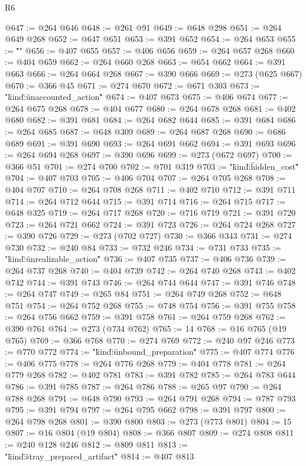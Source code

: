 \begin{lexlean}{R6}
\begin{coremodule}
{{{{{{{{{{@647 := @264 @646
@648 := @261 @91
@649 := @648 @298
@651 := @264 @649 @268
@652 := @647 @651
@653 := @391 @652
@654 := @264 @653
@655 := "\"}"
@656 := @407 @655
@657 := @406 @656
@659 := @264 @657 @268
@660 := @404 @659
@662 := @264 @660 @268
@663 := @654 @662
@664 := @391 @663
@666 := @264 @664 @268
@667 := @390 @666
@669 := @273 (@625 @667)
@670 := @366 @45
@671 := @274 @670
@672 := @671 @303
@673 := "{\"kind\":\"unaccounted_action\""
@674 := @407 @673
@675 := @406 @674
@677 := @264 @675 @268
@678 := @404 @677
@680 := @264 @678 @268
@681 := @402 @680
@682 := @391 @681
@684 := @264 @682 @644
@685 := @391 @684
@686 := @264 @685
@687 := @648 @309
@689 := @264 @687 @268
@690 := @686 @689
@691 := @391 @690
@693 := @264 @691 @662
@694 := @391 @693
@696 := @264 @694 @268
@697 := @390 @696
@699 := @273 (@672 @697)
@700 := @366 @51
@701 := @274 @700
@702 := @701 @319
@703 := "{\"kind\":\"hidden_cost\""
@704 := @407 @703
@705 := @406 @704
@707 := @264 @705 @268
@708 := @404 @707
@710 := @264 @708 @268
@711 := @402 @710
@712 := @391 @711
@714 := @264 @712 @644
@715 := @391 @714
@716 := @264 @715
@717 := @648 @325
@719 := @264 @717 @268
@720 := @716 @719
@721 := @391 @720
@723 := @264 @721 @662
@724 := @391 @723
@726 := @264 @724 @268
@727 := @390 @726
@729 := @273 (@702 @727)
@730 := @366 @343
@731 := @274 @730
@732 := @240 @84
@733 := @732 @246
@734 := @731 @733
@735 := "{\"kind\":\"unrealizable_action\""
@736 := @407 @735
@737 := @406 @736
@739 := @264 @737 @268
@740 := @404 @739
@742 := @264 @740 @268
@743 := @402 @742
@744 := @391 @743
@746 := @264 @744 @644
@747 := @391 @746
@748 := @264 @747
@749 := @265 @84
@751 := @264 @749 @268
@752 := @648 @751
@754 := @264 @752 @268
@755 := @748 @754
@756 := @391 @755
@758 := @264 @756 @662
@759 := @391 @758
@761 := @264 @759 @268
@762 := @390 @761
@764 := @273 (@734 @762)
@765 := 14
@768 := @16 @765 (@19 @765)
@769 := @366 @768
@770 := @274 @769
@772 := @240 @97 @246
@773 := @770 @772
@774 := "{\"kind\":\"unbound_preparation\""
@775 := @407 @774
@776 := @406 @775
@778 := @264 @776 @268
@779 := @404 @778
@781 := @264 @779 @268
@782 := @402 @781
@783 := @391 @782
@785 := @264 @783 @644
@786 := @391 @785
@787 := @264 @786
@788 := @265 @97
@790 := @264 @788 @268
@791 := @648 @790
@793 := @264 @791 @268
@794 := @787 @793
@795 := @391 @794
@797 := @264 @795 @662
@798 := @391 @797
@800 := @264 @798 @268
@801 := @390 @800
@803 := @273 (@773 @801)
@804 := 15
@807 := @16 @804 (@19 @804)
@808 := @366 @807
@809 := @274 @808
@811 := @240 @128 @246
@812 := @809 @811
@813 := "{\"kind\":\"stray_prepared_artifact\""
@814 := @407 @813
}}}}}}}}}}}}}}
\end{coremodule}
\end{lexlean}
